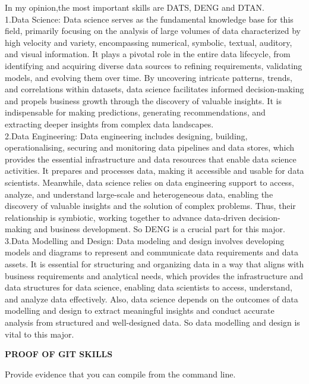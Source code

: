 \documentclass[a4paper, 11pt]{report}
\begin{document}
In my opinion,the most important skills are DATS, DENG and DTAN.\\  1.Data Science: Data science serves as the fundamental knowledge base for this field\cite{van2016data}, primarily focusing on the analysis of large volumes of data characterized by high velocity and variety, encompassing numerical, symbolic, textual, auditory, and visual information. It plays a pivotal role in the entire data lifecycle, from identifying and acquiring diverse data sources to refining requirements, validating models, and evolving them over time. By uncovering intricate patterns, trends, and correlations within datasets, data science facilitates informed decision-making and propels business growth through the discovery of valuable insights. It is indispensable for making predictions, generating recommendations, and extracting deeper insights from complex data landscapes.
\\  2.Data Engineering: Data engineering includes designing, building, operationalising, securing and monitoring data pipelines and data stores, which provides the essential infrastructure and data resources that enable data science activities.\cite{birnholtz2003data} It prepares and processes data, making it accessible and usable for data scientists. Meanwhile, data science relies on data engineering support to access, analyze, and understand large-scale and heterogeneous data, enabling the discovery of valuable insights and the solution of complex problems. Thus, their relationship is symbiotic, working together to advance data-driven decision-making and business development. So DENG is a crucial part for this major.
\\  3.Data Modelling and Design: Data modeling and design involves developing models and diagrams to represent and communicate data requirements and data assets. It is essential for structuring and organizing data in a way that aligns with business requirements and analytical needs\cite{brodie1984development}, which provides the infrastructure and data structures for data science, enabling data scientists to access, understand, and analyze data effectively. Also, data science depends on the outcomes of data modelling and design to extract meaningful insights and conduct accurate analysis from structured and well-designed data. So data modelling and design is vital to this major.

\textbf{PROOF OF GIT SKILLS}

Provide evidence that you can compile from the command line.
\end{document}
